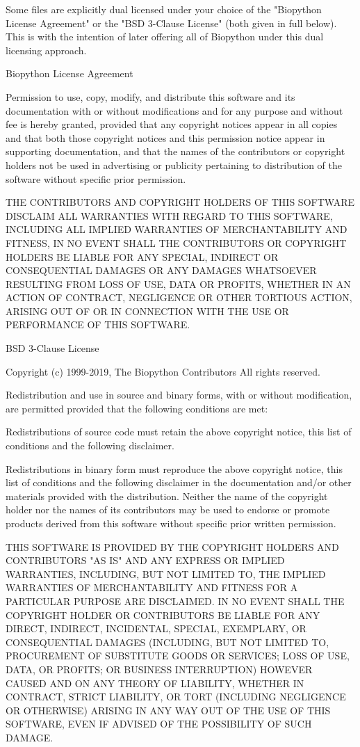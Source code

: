 Some files are explicitly dual licensed under your choice of the "Biopython License Agreement" or the "BSD 3-Clause License" (both given in full below). This is with the intention of later offering all of Biopython under this dual licensing approach.

Biopython License Agreement

Permission to use, copy, modify, and distribute this software and its documentation with or without modifications and for any purpose and without fee is hereby granted, provided that any copyright notices appear in all copies and that both those copyright notices and this permission notice appear in supporting documentation, and that the names of the contributors or copyright holders not be used in advertising or publicity pertaining to distribution of the software without specific prior permission.

THE CONTRIBUTORS AND COPYRIGHT HOLDERS OF THIS SOFTWARE DISCLAIM ALL WARRANTIES WITH REGARD TO THIS SOFTWARE, INCLUDING ALL IMPLIED WARRANTIES OF MERCHANTABILITY AND FITNESS, IN NO EVENT SHALL THE CONTRIBUTORS OR COPYRIGHT HOLDERS BE LIABLE FOR ANY SPECIAL, INDIRECT OR CONSEQUENTIAL DAMAGES OR ANY DAMAGES WHATSOEVER RESULTING FROM LOSS OF USE, DATA OR PROFITS, WHETHER IN AN ACTION OF CONTRACT, NEGLIGENCE OR OTHER TORTIOUS ACTION, ARISING OUT OF OR IN CONNECTION WITH THE USE OR PERFORMANCE OF THIS SOFTWARE.

BSD 3-Clause License

Copyright (c) 1999-2019, The Biopython Contributors All rights reserved.

Redistribution and use in source and binary forms, with or without modification, are permitted provided that the following conditions are met:

Redistributions of source code must retain the above copyright notice, this list of conditions and the following disclaimer.

Redistributions in binary form must reproduce the above copyright notice, this list of conditions and the following disclaimer in the documentation and/or other materials provided with the distribution.
Neither the name of the copyright holder nor the names of its contributors may be used to endorse or promote products derived from this software without specific prior written permission.

THIS SOFTWARE IS PROVIDED BY THE COPYRIGHT HOLDERS AND CONTRIBUTORS "AS IS" AND ANY EXPRESS OR IMPLIED WARRANTIES, INCLUDING, BUT NOT LIMITED TO, THE IMPLIED WARRANTIES OF MERCHANTABILITY AND FITNESS FOR A PARTICULAR PURPOSE ARE DISCLAIMED. IN NO EVENT SHALL THE COPYRIGHT HOLDER OR CONTRIBUTORS BE LIABLE FOR ANY DIRECT, INDIRECT, INCIDENTAL, SPECIAL, EXEMPLARY, OR CONSEQUENTIAL DAMAGES (INCLUDING, BUT NOT LIMITED TO, PROCUREMENT OF SUBSTITUTE GOODS OR SERVICES; LOSS OF USE, DATA, OR PROFITS; OR BUSINESS INTERRUPTION) HOWEVER CAUSED AND ON ANY THEORY OF LIABILITY, WHETHER IN CONTRACT, STRICT LIABILITY, OR TORT (INCLUDING NEGLIGENCE OR OTHERWISE) ARISING IN ANY WAY OUT OF THE USE OF THIS SOFTWARE, EVEN IF ADVISED OF THE POSSIBILITY OF SUCH DAMAGE.


